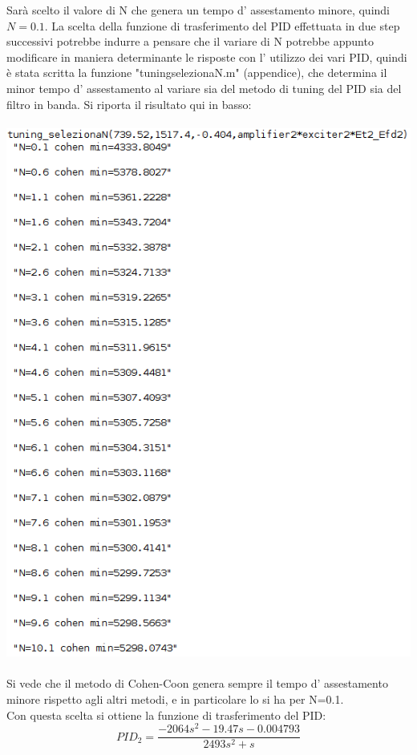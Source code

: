 \documentclass[Lau,noexaminfo]{sapthesis}
\begin{document}
	Sarà scelto il valore di N che genera un tempo d' assestamento minore, quindi $N=0.1$.
	La scelta della funzione di trasferimento del PID effettuata in due step successivi potrebbe indurre a pensare che il variare di N potrebbe appunto modificare in maniera determinante le risposte con l' utilizzo dei vari PID, quindi è stata scritta la funzione "tuning\textunderscore selezionaN.m" (appendice), che determina il minor tempo d' assestamento al variare sia del metodo di tuning del PID sia del filtro in banda. Si riporta il risultato qui in basso:\\\\
	\includegraphics[scale=0.5]{tuning_selezionaN_P2} \\\\
	Si vede che il metodo di Cohen-Coon genera sempre il tempo d' assestamento minore rispetto agli altri metodi, e in particolare lo si ha per N=0.1.\\
	Con questa scelta si ottiene la funzione di trasferimento del PID:
	\begin{equation*}
	PID_2=\frac{-2064s^2-19.47s-0.004793}{2493s^2+s}
	\end{equation*}
\end{document}
